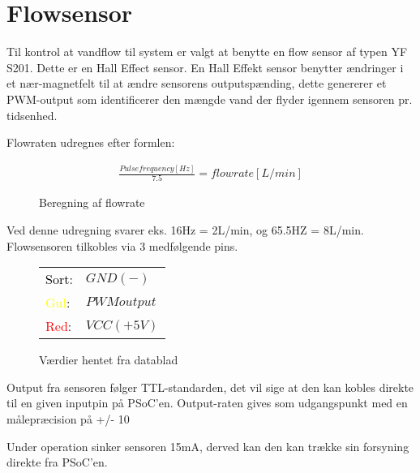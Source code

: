 
\section{Flowsensor}
Til kontrol at vandflow til system er valgt at benytte en flow sensor af typen YF S201. 
Dette er en Hall Effect sensor. En Hall Effekt sensor benytter ændringer i et nær-magnetfelt til at 
ændre sensorens outputspænding, dette genererer et PWM-output som identificerer den mængde vand 
der flyder igennem sensoren pr. tidsenhed.

Flowraten udregnes efter formlen: 
				
\begin{figure}[!h]
    \begin{align*}
       \frac{Pulse frequency [Hz]}{7.5} = flowrate[L/min]
    \end{align*}
\label{eq:PWM}
\caption{Beregning af flowrate}
\end{figure}				

Ved denne udregning svarer eks. 16Hz = 2L/min, og 65.5HZ = 8L/min. 
Flowsensoren tilkobles via 3 medfølgende pins.

\begin{figure}[!h]
	\begin{center}
		\begin{tabular}{ l l }
			 \textcolor{black}{Sort}:   & $GND(-)$ 		\\ 
			 \textcolor{yellow}{Gul}:   & $PWM output$ 	\\  
			 \textcolor{red}{Red}:    	& $VCC(+5V)$ 	\\
		\end{tabular}
	\end{center}
\caption{Værdier hentet fra datablad}
\end{figure}

Output fra sensoren følger TTL-standarden, det vil sige at den kan kobles direkte til en given inputpin på PSoC'en. Output-raten gives som udgangspunkt med en målepræcision på +/- 10%
 
Under operation sinker sensoren 15mA, derved kan den kan trække sin forsyning direkte fra PSoC'en.

